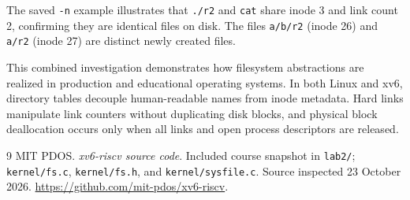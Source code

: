 \documentclass{assets/utmreport}
\begin{document}
The saved \texttt{-n} example illustrates that \texttt{./r2} and \texttt{cat} share inode 3 and link count 2, confirming they are identical files on disk. The files \texttt{a/b/r2} (inode 26) and \texttt{a/r2} (inode 27) are distinct newly created files.

\utmconclusions
This combined investigation demonstrates how filesystem abstractions are realized in production and educational operating systems. In both Linux and xv6, directory tables decouple human-readable names from inode metadata. Hard links manipulate link counters without duplicating disk blocks, and physical block deallocation occurs only when all links and open process descriptors are released.

\begin{thebibliography}{9}
 MIT PDOS. \textit{xv6-riscv source code}. Included course snapshot in \texttt{lab2/}; \texttt{kernel/fs.c}, \texttt{kernel/fs.h}, and \texttt{kernel/sysfile.c}. Source inspected 23 October 2026. \url{https://github.com/mit-pdos/xv6-riscv}.
\end{thebibliography}
\end{document}
